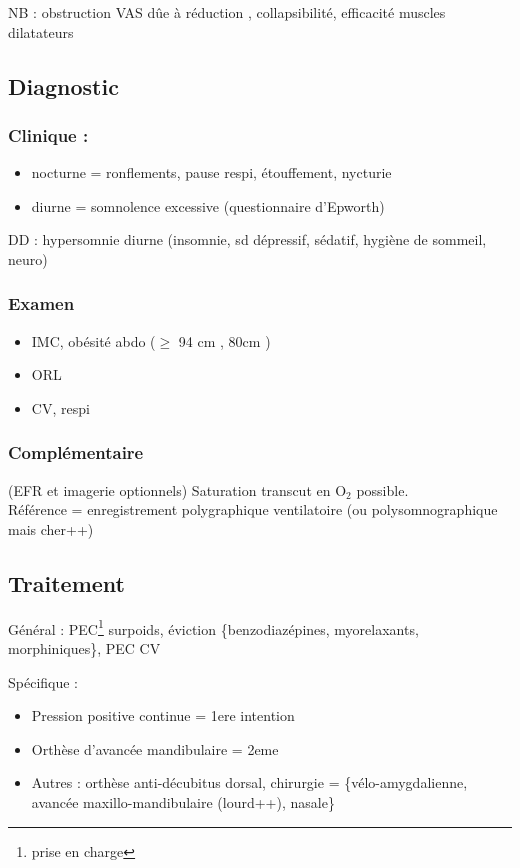 \documentclass{article}
\begin{document}
NB : obstruction \gls{VAS} dûe à {réduction \diameter, \nearrow{} collapsibilité,
  \searrow{} efficacité muscles dilatateurs}
\subsection{Diagnostic}
\subsubsection{Clinique :}
\begin{itemize}
\item nocturne = ronflements, pause respi, étouffement, nycturie
\item diurne = somnolence excessive (questionnaire d'Epworth)
\end{itemize}
DD : hypersomnie diurne (insomnie, sd dépressif, sédatif, hygiène de sommeil,
neuro)
\subsubsection{Examen}
\begin{itemize}
\item IMC, obésité abdo (\(\ge\) 94 cm \male, 80cm \female)
\item ORL
\item CV, respi
\end{itemize}
\subsubsection{Complémentaire}
(EFR et imagerie optionnels)
Saturation transcut en O\(_{\text{2}}\) possible.\\
Référence = enregistrement polygraphique ventilatoire (ou polysomnographique
mais cher++)
\subsection{Traitement}
Général : PEC\footnote{prise en charge} surpoids, éviction \{benzodiazépines,
myorelaxants, morphiniques\}, PEC CV

Spécifique :
\begin{itemize}
\item Pression positive continue = 1ere intention
\item Orthèse d'avancée mandibulaire = 2eme
\item Autres : orthèse anti-décubitus dorsal, chirurgie = \{vélo-amygdalienne,
  avancée maxillo-mandibulaire (lourd++), nasale\}
\end{itemize}
\end{document}
